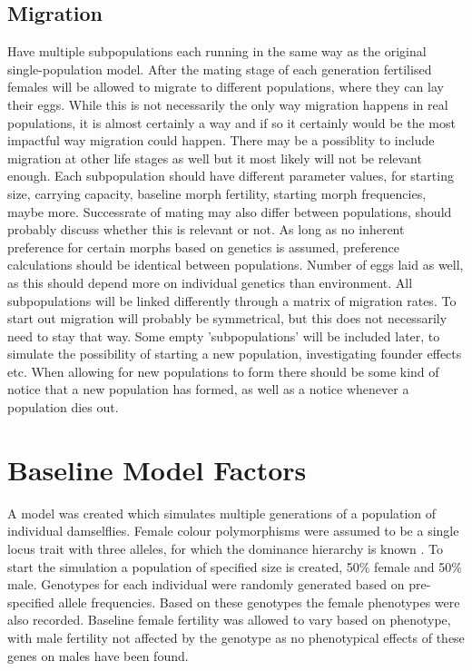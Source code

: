 \documentclass{article}
\begin{document}
\subsection{Migration}
Have multiple subpopulations each running in the same way as the original single-population model.
After the mating stage of each generation fertilised females will be allowed to migrate to different populations, where they can lay their eggs. While this is not necessarily the only way migration happens in real populations, it is almost certainly a way and if so it certainly would be the most impactful way migration could happen. There may be a possiblity to include migration at other life stages as well but it most likely will not be relevant enough.
Each subpopulation should have different parameter values, for starting size, carrying capacity, baseline morph fertility, starting morph frequencies, maybe more.
Successrate of mating may also differ between populations, should probably discuss whether this is relevant or not.
As long as no inherent preference for certain morphs based on genetics is assumed, preference calculations should be identical between populations. Number of eggs laid as well, as this should depend more on individual genetics than environment.
All subpopulations will be linked differently through a matrix of migration rates. To start out migration will probably be symmetrical, but this does not necessarily need to stay that way.
Some empty 'subpopulations' will be included later, to simulate the possibility of starting a new population, investigating founder effects etc.
When allowing for new populations to form there should be some kind of notice that a new population has formed, as well as a notice whenever a population dies out.

\section{Baseline Model Factors}
A model was created which simulates multiple generations of a population of individual damselflies. Female colour polymorphisms were assumed to be a single locus trait with three alleles, for which the dominance hierarchy is known \cite{Cordero1990}. To start the simulation a population of specified size is created, 50\% female and 50\% male. Genotypes for each individual were randomly generated based on pre-specified allele frequencies. Based on these genotypes the female phenotypes were also recorded. Baseline female fertility was allowed to vary based on phenotype, with male fertility not affected by the genotype as no phenotypical effects of these genes on males have been found.
\end{document}
